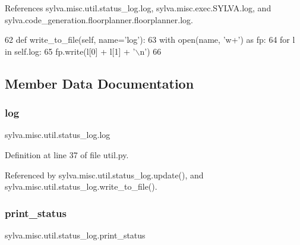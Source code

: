 References sylva.\+misc.\+util.\+status\+\_\+log.\+log, sylva.\+misc.\+exec.\+S\+Y\+L\+V\+A.\+log, and sylva.\+code\+\_\+generation.\+floorplanner.\+floorplanner.\+log.


\begin{DoxyCode}
62     \textcolor{keyword}{def }write\_to\_file(self, name='log'):
63         with open(name, \textcolor{stringliteral}{'w+'}) \textcolor{keyword}{as} fp:
64             \textcolor{keywordflow}{for} l \textcolor{keywordflow}{in} self.log:
65                 fp.write(l[0] + l[1] + \textcolor{stringliteral}{'\(\backslash\)n'})
66 
\end{DoxyCode}


\subsection{Member Data Documentation}
\mbox{\label{classsylva_1_1misc_1_1util_1_1status__log_ab581acbcedf70a8afe11c96ea003e951}} 
\subsubsection{\texorpdfstring{log}{log}}
{\footnotesize\ttfamily sylva.\+misc.\+util.\+status\+\_\+log.\+log}



Definition at line 37 of file util.\+py.



Referenced by sylva.\+misc.\+util.\+status\+\_\+log.\+update(), and sylva.\+misc.\+util.\+status\+\_\+log.\+write\+\_\+to\+\_\+file().

\mbox{\label{classsylva_1_1misc_1_1util_1_1status__log_a6bed7b9c7fffc5bf27401ddf0481a71d}} 
\subsubsection{\texorpdfstring{print\+\_\+status}{print\_status}}
{\footnotesize\ttfamily sylva.\+misc.\+util.\+status\+\_\+log.\+print\+\_\+status}




